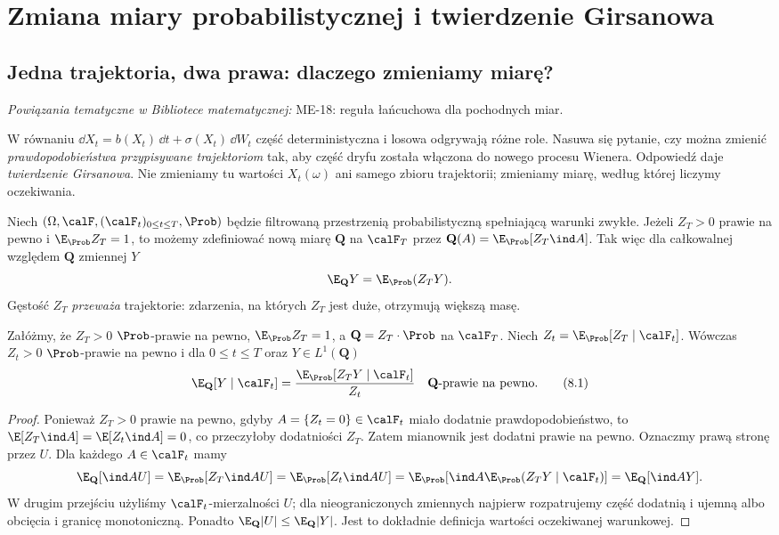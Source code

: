 \chapter{Zmiana miary probabilistycznej i twierdzenie Girsanowa}
\label{ch:girsanov}

\providecommand{\atlasref}[2]{#2}


\section{Jedna trajektoria, dwa prawa: dlaczego zmieniamy miarę?}

\noindent\emph{Powiązania tematyczne w Bibliotece matematycznej:} \atlasref{ME-18::thm:RN-chain-18}{ME-18: reguła łańcuchowa dla pochodnych miar}.


W równaniu $\dd X_t=b(X_t)\,\dd t+\sigma(X_t)\,\dd W_t$
część deterministyczna i losowa odgrywają różne role.
Nasuwa się pytanie, czy można zmienić \emph{prawdopodobieństwa
przypisywane trajektoriom} tak, aby część dryfu została
włączona do nowego procesu Wienera. Odpowiedź daje
\emph{twierdzenie Girsanowa}. Nie zmieniamy tu wartości $X_t(\omega)$
ani samego zbioru trajektorii; zmieniamy miarę, według której
liczymy oczekiwania.

Niech $(\Omega,\calF,(\calF_t)_{0\le t\le T},\Prob)$
będzie filtrowaną przestrzenią probabilistyczną spełniającą
warunki zwykłe. Jeżeli $Z_T>0$ prawie na pewno i
$\E_{\Prob}Z_T=1$, to możemy zdefiniować nową miarę
$\mathbf Q$ na $\calF_T$ przez
$\mathbf Q(A)=\E_{\Prob}[Z_T\ind A]$.
Tak więc dla całkowalnej względem $\mathbf Q$ zmiennej $Y$
\[
\E_{\mathbf Q}Y=\E_{\Prob}(Z_TY).
\]
Gęstość $Z_T$ \emph{przeważa} trajektorie: zdarzenia,
na których $Z_T$ jest duże, otrzymują większą masę.

\begin{lemat}
\label{lem:bayes-change}
Załóżmy, że $Z_T>0$ $\Prob$-prawie na pewno,
$\E_{\Prob}Z_T=1$, a $\mathbf Q=Z_T\cdot\Prob$
na $\calF_T$. Niech $Z_t=\E_{\Prob}[Z_T\mid\calF_t]$.
Wówczas $Z_t>0$ $\Prob$-prawie na pewno i dla
$0\le t\le T$ oraz $Y\in L^1(\mathbf Q)$
\[
\E_{\mathbf Q}[Y\mid\calF_t]
=\frac{\E_{\Prob}[Z_TY\mid\calF_t]}{Z_t}
\quad\mathbf Q\text{-prawie na pewno}.
\tag{8.1}\label{eq:bayes-measure}
\]
\end{lemat}
\begin{proof}
Ponieważ $Z_T>0$ prawie na pewno, gdyby
$A=\{Z_t=0\}\in\calF_t$ miało dodatnie prawdopodobieństwo,
to $\E[Z_T\ind A]=\E[Z_t\ind A]=0$,
co przeczyłoby dodatniości $Z_T$. Zatem mianownik
jest dodatni prawie na pewno. Oznaczmy prawą stronę
przez $U$. Dla każdego $A\in\calF_t$ mamy
\[
\E_{\mathbf Q}[\ind A U]
=\E_{\Prob}[Z_T\ind A U]
=\E_{\Prob}[Z_t\ind A U]
=\E_{\Prob}[\ind A\E_{\Prob}(Z_TY\mid\calF_t)]
=\E_{\mathbf Q}[\ind A Y].
\]
W drugim przejściu użyliśmy $\calF_t$-mierzalności $U$;
dla nieograniczonych zmiennych najpierw rozpatrujemy
część dodatnią i ujemną albo obcięcia i granicę monotoniczną.
Ponadto $\E_{\mathbf Q}|U|\le\E_{\mathbf Q}|Y|$.
Jest to dokładnie definicja wartości oczekiwanej warunkowej.
\end{proof}

